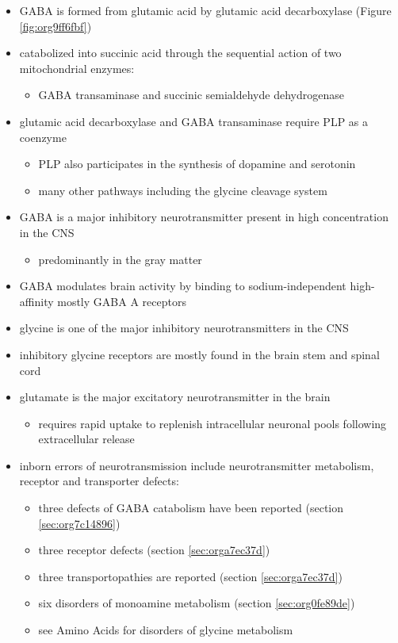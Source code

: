 \documentclass[12pt]{scrartcl}
\begin{document}
\begin{itemize}
\item GABA is formed from glutamic acid by glutamic acid decarboxylase
(Figure \ref{fig:org9ff6fbf})
\item catabolized into succinic acid through the sequential action of two
mitochondrial enzymes:
\begin{itemize}
\item GABA transaminase and succinic semialdehyde dehydrogenase
\end{itemize}
\item glutamic acid decarboxylase and GABA transaminase require PLP as a coenzyme
\begin{itemize}
\item PLP also participates in the synthesis of dopamine and serotonin
\item many other pathways including the glycine cleavage system
\end{itemize}
\item GABA is a major inhibitory neurotransmitter present in high
concentration in the CNS
\begin{itemize}
\item predominantly in the gray matter
\end{itemize}
\item GABA modulates brain activity by binding to
sodium-independent high-affinity  mostly GABA A receptors
\item glycine is one of the major inhibitory neurotransmitters in the CNS
\item inhibitory glycine receptors are mostly found in the brain stem
and spinal cord
\item glutamate is the major excitatory neurotransmitter in the brain
\begin{itemize}
\item requires rapid uptake to replenish intracellular
neuronal pools following extracellular release
\end{itemize}
\item inborn errors of neurotransmission include neurotransmitter
metabolism, receptor and transporter defects:
\begin{itemize}
\item three defects of GABA catabolism have been reported (section \ref{sec:org7c14896})
\item three receptor defects (section \ref{sec:orga7ec37d})
\item three transportopathies are reported (section \ref{sec:orga7ec37d})
\item six disorders of monoamine metabolism (section \ref{sec:org0fe89de})
\item see Amino Acids for disorders of glycine metabolism
\end{itemize}
\end{itemize}
\end{document}
